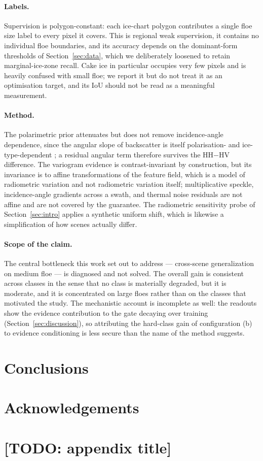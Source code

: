 \documentclass[preprint,12pt,authoryear]{elsarticle}
\begin{document}
\paragraph{Labels.} Supervision is polygon-constant: each ice-chart polygon
contributes a single floe size label to every pixel it covers. This is regional
weak supervision, it contains no individual floe boundaries, and its accuracy
depends on the dominant-form thresholds of Section~\ref{sec:data}, which we
deliberately loosened to retain marginal-ice-zone recall. Cake ice in particular
occupies very few pixels and is heavily confused with small floe; we report it
but do not treat it as an optimisation target, and its IoU should not be read as
a meaningful measurement.

\paragraph{Method.} The polarimetric prior attenuates but does not remove
incidence-angle dependence, since the angular slope of backscatter is itself
polarisation- and ice-type-dependent \citep{aldenhoff2020incidence}; a residual
angular term therefore survives the HH$-$HV difference. The variogram evidence
is contrast-invariant by construction, but its invariance is to affine
transformations of the feature field, which is a model of radiometric variation
and not radiometric variation itself; multiplicative speckle, incidence-angle
gradients across a swath, and thermal noise residuals are not affine and are not
covered by the guarantee. The radiometric sensitivity probe of
Section~\ref{sec:intro} applies a synthetic uniform shift, which is likewise a
simplification of how scenes actually differ.

\paragraph{Scope of the claim.} The central bottleneck this work set out to
address --- cross-scene generalization on medium floe --- is diagnosed and not
solved. The overall gain is consistent across classes in the sense that no class
is materially degraded, but it is moderate, and it is concentrated on large
floes rather than on the classes that motivated the study. The mechanistic
account is incomplete as well: the readouts show the evidence contribution to
the gate decaying over training (Section~\ref{sec:discussion}), so attributing
the hard-class gain of configuration (b) to evidence conditioning is less secure
than the name of the method suggests.

\section{Conclusions}
\label{sec:conclusions}


\section*{Acknowledgements}


\appendix

\section{[TODO: appendix title]}



\end{document}

